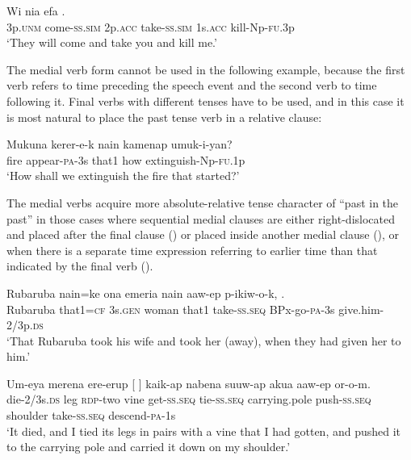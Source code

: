 \ea%
\label{ex:x1027}
\gll Wi  nia  efa . \\
3p.\textsc{unm} come-\textsc{ss}.\textsc{sim} 2p.\textsc{acc} take-\textsc{ss}.\textsc{sim} 1s.\textsc{acc} kill-Np-\textsc{fu}.3p\\
\glt`They will come and take you and kill me.'
\z

The medial verb form cannot be used in the following example, because the first verb refers to time preceding the speech event and the second verb to time following it. Final verbs with different tenses have to be used, and in this case it is most natural to place the past tense verb in a relative clause: 

\ea%
\label{ex:x1030}
\gll Mukuna kerer-e-k nain kamenap umuk-i-yan? \\
fire appear-\textsc{pa}-3s that1 how extinguish-Np-\textsc{fu}.1p\\
\glt`How shall we extinguish the fire that started?'
\z

The medial verbs acquire more absolute-relative tense character of ``past in the past'' \citep[65]{Comrie1985} in those cases where sequential medial clauses are either right-dislocated and placed after the final clause () or placed inside another medial clause (), or when there is a separate time expression referring to earlier time than that indicated by the final verb (). 

\ea%
\label{ex:x1031}
\gll Rubaruba nain=ke ona emeria nain aaw-ep p-ikiw-o-k, .\\
Rubaruba that1=\textsc{cf} 3s.\textsc{gen} woman that1 take-\textsc{ss}.\textsc{seq} BPx-go-\textsc{pa}-3s give.him-2/3p.\textsc{ds}\\
\glt`That Rubaruba took his wife and took her (away), when they had given her to him.'
\z

\ea%
\label{ex:x1032}
\gll Um-eya merena ere-erup [ ] kaik-ap nabena suuw-ap akua aaw-ep or-o-m.\\
die-2/3s.\textsc{ds} leg \textsc{rdp}-two vine get-\textsc{ss}.\textsc{seq} tie-\textsc{ss}.\textsc{seq} carrying.pole push-\textsc{ss}.\textsc{seq} shoulder take-\textsc{ss}.\textsc{seq} descend-\textsc{pa}-1s\\
\glt `It died, and I tied its legs in pairs with a vine that I had gotten, and pushed it to the carrying pole and carried it down on my shoulder.'
\z

